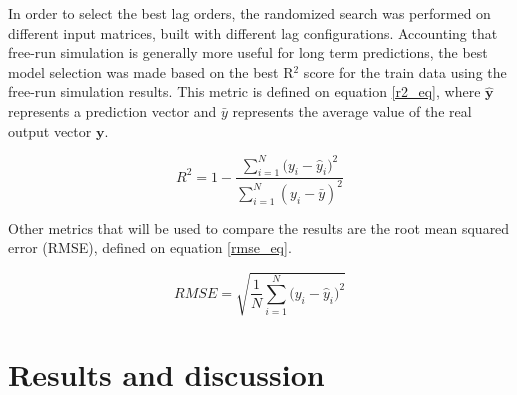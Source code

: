 \documentclass[conference]{IEEEtran}
\begin{document}
In order to select the best lag orders, the randomized search was performed on different input matrices, built with different lag configurations. Accounting that free-run simulation is generally more useful for long term predictions, the best model selection was made based on the best R$^2$ score for the train data using the free-run simulation results. This metric is defined on equation \ref{r2_eq}, where $\mathbf{\hat{y}}$ represents a prediction vector and $\bar{y}$ represents the average value of the real output vector $\mathbf{y}$.



\begin{equation}\label{r2_eq}
    R^2 = 1 - \frac{\sum_{i=1}^N{(y_i - \hat{y}_i})^2}{\sum_{i=1}^N{(y_i - \bar{y})^2}}
\end{equation}

Other metrics that will be used to compare the results are the root mean squared error (RMSE), defined on equation \ref{rmse_eq}. 


\begin{equation}\label{rmse_eq}
    RMSE = \sqrt{\frac{1}{N}\sum_{i=1}^N{(y_i - \hat{y}_i})^2}
\end{equation}



\section{Results and discussion}\label{section_results}

%
%
%
\end{document}
